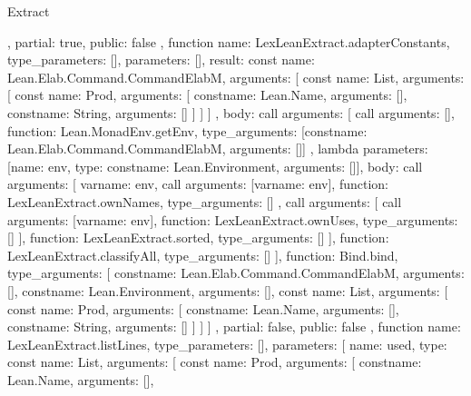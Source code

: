 \begin{lexlean}{Extract}
\begin{toolingmodule}
{{{      },
      partial: true,
      public: false
    },
    function{
      name: LexLeanExtract.adapterConstants,
      type_parameters: [],
      parameters: [],
      result: const{
        name: Lean.Elab.Command.CommandElabM,
        arguments: [
          const{
            name: List,
            arguments: [
              const{
                name: Prod,
                arguments: [
                  const{name: Lean.Name, arguments: []},
                  const{name: String, arguments: []}
                ]
              }
            ]
          }
        ]
      },
      body: call{
        arguments: [
          call{
            arguments: [],
            function: Lean.MonadEnv.getEnv,
            type_arguments: [const{name: Lean.Elab.Command.CommandElabM, arguments: []}]
          },
          lambda{
            parameters: [{name: env, type: const{name: Lean.Environment, arguments: []}}],
            body: call{
              arguments: [
                var{name: env},
                call{
                  arguments: [var{name: env}],
                  function: LexLeanExtract.ownNames,
                  type_arguments: []
                },
                call{
                  arguments: [
                    call{
                      arguments: [var{name: env}],
                      function: LexLeanExtract.ownUses,
                      type_arguments: []
                    }
                  ],
                  function: LexLeanExtract.sorted,
                  type_arguments: []
                }
              ],
              function: LexLeanExtract.classifyAll,
              type_arguments: []
            }
          }
        ],
        function: Bind.bind,
        type_arguments: [
          const{name: Lean.Elab.Command.CommandElabM, arguments: []},
          const{name: Lean.Environment, arguments: []},
          const{
            name: List,
            arguments: [
              const{
                name: Prod,
                arguments: [
                  const{name: Lean.Name, arguments: []},
                  const{name: String, arguments: []}
                ]
              }
            ]
          }
        ]
      },
      partial: false,
      public: false
    },
    function{
      name: LexLeanExtract.listLines,
      type_parameters: [],
      parameters: [
        {
          name: used,
          type: const{
            name: List,
            arguments: [
              const{
                name: Prod,
                arguments: [
                  const{name: Lean.Name, arguments: []},
}}}}}
\end{toolingmodule}
\end{lexlean}
